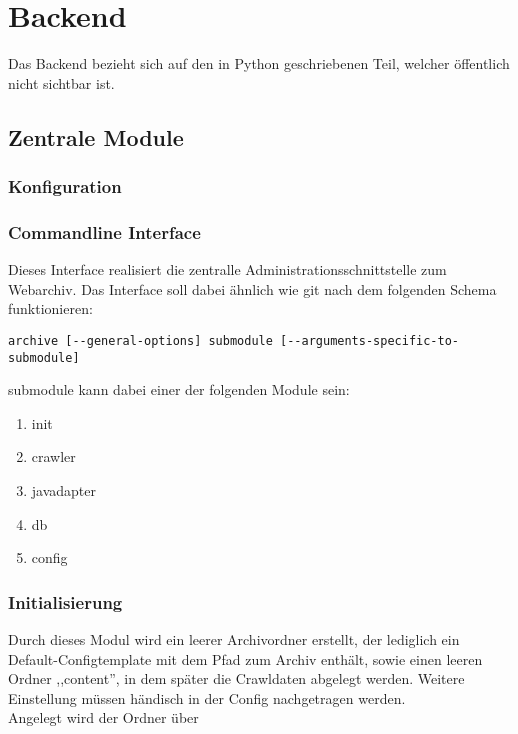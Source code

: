 \chapter{Backend}
\label{cha:backend}
Das Backend bezieht sich auf den in Python geschriebenen Teil, welcher öffentlich nicht sichtbar ist.

\section{Zentrale Module} 
\label{sec:zentrale_module}

\subsection{Konfiguration}
\label{sub:confighandler}

\subsection{Commandline Interface}
\label{sub:commandline_interface}
Dieses Interface realisiert die zentralle Administrationsschnittstelle zum Webarchiv. 
Das Interface soll dabei ähnlich wie git nach dem folgenden Schema funktionieren:
\begin{verbatim}
archive [--general-options] submodule [--arguments-specific-to-submodule]
\end{verbatim}
submodule kann dabei einer der folgenden Module sein:
\begin{enumerate}
    \item init
    \item crawler
    \item javadapter 
    \item db
    \item config
\end{enumerate}

\subsection{Initialisierung} 
\label{sub:initialisierung}
Durch dieses Modul wird ein leerer Archivordner erstellt, der lediglich
ein Default-Configtemplate mit dem Pfad zum Archiv enthält, sowie einen leeren Ordner ,,content'',
in dem später die Crawldaten abgelegt werden.
Weitere Einstellung müssen händisch in der Config nachgetragen werden.
\\
Angelegt wird der Ordner über %

